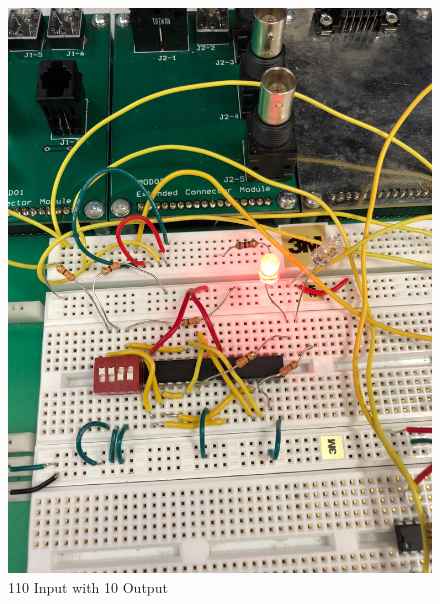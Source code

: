 \documentclass[10pt]{article}
\begin{document}
\begin{centering}
	\begin{figure} [H]
		\centering
		\includegraphics[scale=0.07]{images/110led.jpg}
		\caption{110 Input with 10 Output}
	\end{figure}
\end{centering}
\end{document}
